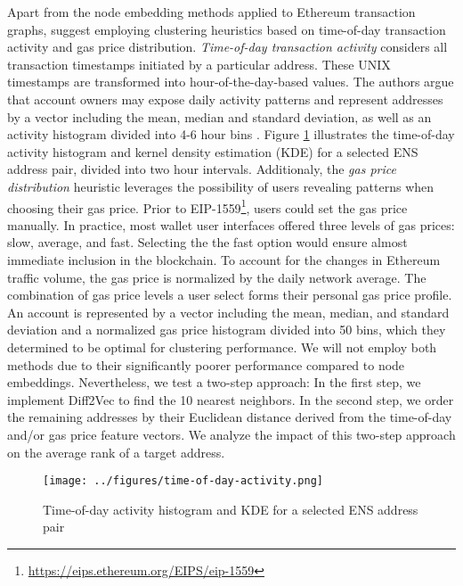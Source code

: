 \documentclass[12pt,a4paper,titlepage,oneside,english]{article}
\begin{document}
Apart from the node embedding methods applied to Ethereum transaction graphs, \cite{Beres2020} suggest employing clustering heuristics based on time-of-day transaction activity and gas price distribution. \newline
\textit{Time-of-day transaction activity} considers all transaction timestamps initiated by a particular address. These UNIX timestamps are transformed into hour-of-the-day-based values. The authors argue that account owners may expose daily activity patterns and represent addresses by a vector including the mean, median and standard deviation, as well as an activity histogram divided into 4-6 hour bins \citep{Beres2020}.  Figure \ref{fig:ToD} illustrates the time-of-day activity histogram and kernel density estimation (KDE) for a selected ENS address pair, divided into two hour intervals.\newline
Additionaly, the \textit{gas price distribution} heuristic leverages the possibility of users revealing patterns when choosing their gas price. Prior to EIP-1559\footnote{\url{https://eips.ethereum.org/EIPS/eip-1559}}, users could set the gas price manually. In practice, most wallet user interfaces offered three levels of gas prices: slow, average, and fast. Selecting the the fast option would ensure almost immediate inclusion in the blockchain. To account for the changes in Ethereum traffic volume, the gas price is normalized by the daily network average. The combination of gas price levels a user select forms their personal gas price profile. An account is represented by a vector including the mean, median, and standard deviation and a normalized gas price histogram divided into 50 bins, which they determined to be optimal for clustering performance. \citep{Beres2020} \newline
We will not employ both methods due to their significantly poorer performance compared to node embeddings. Nevertheless, we test a two-step approach: In the first step, we implement Diff2Vec to find the 10 nearest neighbors. In the second step, we order the remaining addresses by their Euclidean distance derived from the time-of-day and/or gas price feature vectors. We analyze the impact of this two-step approach on the average rank of a target address.

\begin{figure}[h!]
	\centering
	\texttt{[image: ../figures/time-of-day-activity.png]}
	\caption{Time-of-day activity histogram and KDE for a selected ENS address pair}
	\label{fig:ToD}
\end{figure} 
\end{document}
